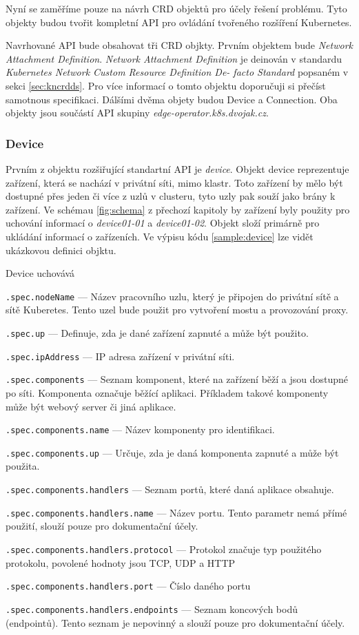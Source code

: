 Nyní se zaměříme pouze na návrh CRD objektů pro účely řešení problému. Tyto objekty budou tvořit kompletní API pro ovládání tvořeného rozšíření Kubernetes.

Navrhované API bude obsahovat tři CRD objkty. Prvním objektem bude \textit{Network Attachment Definition}. \textit{Network Attachment Definition} je deinován v standardu \textit{Kubernetes Network Custom Resource Definition De-
facto Standard} popsaném v sekci \ref{sec:kncrdds}. Pro více informací o tomto objektu doporučuji si přečíst samotnous specifikaci. Dálšími dvěma objety budou Device a Connection. Oba objekty jsou součástí API skupiny \textit{edge-operator.k8s.dvojak.cz}.  
\subsubsection*{Device}
Prvním z objektu rozšiřující standartní API je \textit{device}. Objekt device reprezentuje zařízení, která se nachází v privátní síti, mimo klastr. Toto zařízení by mělo být dostupné přes jeden či více z uzlů v clusteru, tyto uzly pak souží jako brány k zařízení. Ve schémau \ref{fig:schema} z přechozí kapitoly by zařízení byly použity pro uchování informací o \textit{device01-01} a \textit{device01-02}. Objekt složí primárně pro ukládání informací o zařízeních. Ve výpisu kódu \ref{sample:device} lze vidět ukázkovou definici objktu.

Device uchovává 
\begin{description}
    \item \verb|.spec.nodeName| --- Název pracovního uzlu, který je připojen do privátní sítě a sítě Kuberetes. Tento uzel bude použit pro vytvoření mostu a provozování proxy.
    \item \verb|.spec.up| --- Definuje, zda je dané zařízení zapnuté a může být použito.
    \item \verb|.spec.ipAddress| --- IP adresa zařízení v privátní síti.
    \item \verb|.spec.components| --- Seznam komponent, které na zařízení běží a jsou dostupné po síti. Komponenta označuje běžící aplikaci. Příkladem takové komponenty může být webový server či jiná aplikace.  
    \item \verb|.spec.components.name| --- Název komponenty pro identifikaci.
    \item \verb|.spec.components.up| --- Určuje, zda je daná komponenta zapnuté a může být použita.
    \item \verb|.spec.components.handlers| --- Seznam portů, které daná aplikace obsahuje.
    \item \verb|.spec.components.handlers.name| --- Název portu. Tento parametr nemá přímé použití, slouží pouze pro dokumentační účely. 
    \item \verb|.spec.components.handlers.protocol| --- Protokol značuje typ použitého protokolu, povolené hodnoty jsou TCP, UDP a HTTP
    \item \verb|.spec.components.handlers.port| --- Číslo daného portu
    \item \verb|.spec.components.handlers.endpoints| --- Seznam koncových bodů (endpointů). Tento seznam je nepovinný a slouží pouze pro dokumentační účely.
\end{description}

